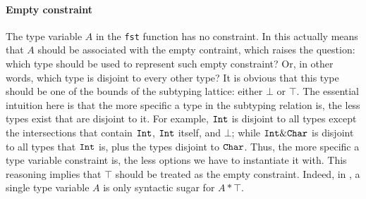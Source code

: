\paragraph{Empty constraint}
The type variable $A$ in the \lstinline$fst$ function has no constraint.
In \name this actually means that $A$ should be associated with the empty contraint,
which raises the question: which type should be used to represent such empty constraint?
Or, in other words, which type is disjoint to every other type? 
It is obvious that this type should be one of the bounds of the subtyping lattice: either $\bot$ or
$\top$.
The essential intuition here is that the more specific a type in the subtyping relation is, the less types
exist that are disjoint to it.
For example, $\texttt{Int}$ is disjoint to all types except the intersections that contain $\texttt{Int}$, $\texttt{Int}$
itself, and $\bot$; while $\texttt{Int} \& \texttt{Char}$ is disjoint to all types that $\texttt{Int}$ is, plus the
types disjoint to $\texttt{Char}$.
Thus, the more specific a type variable constraint is, the less options we have to instantiate it with.
This reasoning implies that $\top$ should be treated as the empty constraint.
Indeed, in \name, a single type variable $A$ is only syntactic sugar
for $A * \top$.
\begin{comment}
\joao{should we say anything here about this going against our
  previous top-disjointness formulation?}
\bruno{yes, but not here. We can discuss this in later sections when
  discussing the technical details.}
For instance, the type of the identity function in System $F$ that reads $\forall A. A \to A$ is 
equivalent to the \name's type $\forall (A * \top). A \to A$.
\end{comment}


